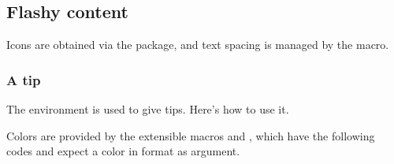 \documentclass[10pt, a4paper]{article}
\begin{document}
\subsection{Flashy content}

\begin{tdocnote}
    Icons are obtained via the  package, and text spacing is managed by the  macro.
\end{tdocnote}


\subsubsection{A tip}

The  environment is used to give tips. Here's how to use it.



\smallskip

\begin{tdocnote}
    Colors are provided by the extensible macros  and , which have the following codes and expect a color in  format as argument.

    \begin{tdoclatex}[code]
    \end{tdoclatex}
\end{tdocnote}
\end{document}
